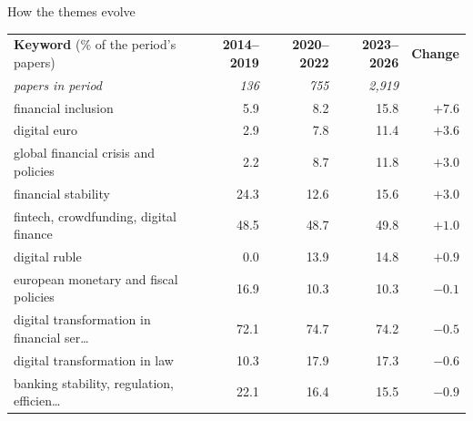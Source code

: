 \documentclass[aspectratio=169,10pt]{beamer}
\begin{document}
\begin{frame}{How the themes evolve}
\scriptsize
\begin{tabular}{@{}p{}rrrr@{}}\toprule
\textbf{Keyword} (\% of the period's papers) & \textbf{2014--2019} & \textbf{2020--2022} & \textbf{2023--2026} & \textbf{Change}\\
\textit{papers in period} & \textit{136} & \textit{755} & \textit{2,919} &\\\midrule
financial inclusion & \cellcolor{c1!5}5.9 & \cellcolor{c1!8}8.2 & \cellcolor{c1!15}15.8 & \textcolor{c4}{$+7.6$} \\
digital euro & \cellcolor{c1!2}2.9 & \cellcolor{c1!7}7.8 & \cellcolor{c1!11}11.4 & \textcolor{c4}{$+3.6$} \\
global financial crisis and policies & \cellcolor{c1!2}2.2 & \cellcolor{c1!8}8.7 & \cellcolor{c1!11}11.8 & \textcolor{c4}{$+3.0$} \\
financial stability & \cellcolor{c1!24}24.3 & \cellcolor{c1!12}12.6 & \cellcolor{c1!15}15.6 & \textcolor{c4}{$+3.0$} \\
fintech, crowdfunding, digital finance & \cellcolor{c1!48}48.5 & \cellcolor{c1!48}48.7 & \cellcolor{c1!49}49.8 & \textcolor{c4}{$+1.0$} \\
digital ruble & \cellcolor{c1!0}0.0 & \cellcolor{c1!13}13.9 & \cellcolor{c1!14}14.8 & \textcolor{c4}{$+0.9$} \\
european monetary and fiscal policies & \cellcolor{c1!16}16.9 & \cellcolor{c1!10}10.3 & \cellcolor{c1!10}10.3 & \textcolor{c2}{$-0.1$} \\
digital transformation in financial ser\dots{} & \cellcolor{c1!60}72.1 & \cellcolor{c1!60}74.7 & \cellcolor{c1!60}74.2 & \textcolor{c2}{$-0.5$} \\
digital transformation in law & \cellcolor{c1!10}10.3 & \cellcolor{c1!17}17.9 & \cellcolor{c1!17}17.3 & \textcolor{c2}{$-0.6$} \\
banking stability, regulation, efficien\dots{} & \cellcolor{c1!22}22.1 & \cellcolor{c1!16}16.4 & \cellcolor{c1!15}15.5 & \textcolor{c2}{$-0.9$} \\

\end{tabular}
\end{frame}
\end{document}
